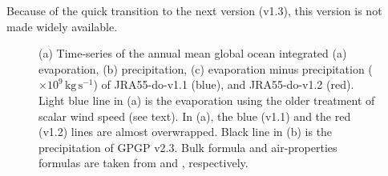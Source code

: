 \documentclass[dvipdfmx]{elsarticle_mod}
\begin{document}
Because of the quick transition to the next version (v1.3), this version is not made widely available.

\begin{figure}[h]
\centering
 \caption{(a) Time-series of the annual mean global ocean integrated (a) evaporation, (b) precipitation, (c) evaporation minus precipitation ($\times 10^{9}\,\mathrm{kg}\, \mathrm{s}^{-1}$) of JRA55-do-v1.1 (blue), and JRA55-do-v1.2 (red). Light blue line in (a) is the evaporation using the older treatment of scalar wind speed (see text). In (a), the blue (v1.1) and the red (v1.2) lines are almost overwrapped. Black line in (b) is the precipitation of GPGP v2.3. Bulk formula and air-properties formulas are taken from \citet{Large_and_Yeager_2009} and \citet{Gill_1982}, respectively.}
  \label{fig:waterflux_v1_1}
\end{figure}
\end{document}
